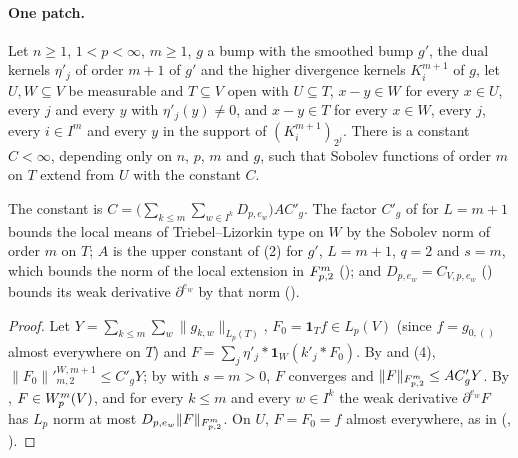 \paragraph{One patch.}

\begin{theorem}
\label{thm:one-patch-extension-higher}
\leanok
{}
Let $n \geq 1$, $1 < p < \infty$, $m \geq 1$, $g$ a bump with the smoothed bump $g'$, the dual
kernels $\eta'_j$ of order $m + 1$ of $g'$ and the higher divergence kernels $K^{m+1}_i$ of $g$,
let $U, W \subseteq V$ be measurable and $T \subseteq V$ open with $U \subseteq T$, $x - y \in W$
for every $x \in U$, every $j$ and every $y$ with $\eta'_j(y) \neq 0$, and $x - y \in T$ for
every $x \in W$, every $j$, every $i \in I^m$ and every $y$ in the support of
$(K^{m+1}_i)_{2^j}$. There is a constant $C < \infty$, depending only on $n$, $p$, $m$ and $g$,
such that Sobolev functions of order $m$ on $T$ extend from $U$ with the constant $C$.
\end{theorem}

The constant is $C = \bigl(\sum_{k \leq m} \sum_{w \in I^k} D_{p, e_w}\bigr) A C'_g$. The factor
$C'_g$ of  for $L = m + 1$ bounds the local means of
Triebel--Lizorkin type on $W$ by the Sobolev norm of order $m$ on $T$; $A$ is the upper constant
of  (2) for $g'$, $L = m + 1$, $q = 2$ and $s = m$, which bounds the
norm of the local extension in $F^{m}_{p,2}$ (); and
$D_{p,e_w} = C_{V,p,e_w}$ () bounds its weak derivative
$\partial^{e_w}$ by that norm ().

\begin{proof}
\leanok
Let $Y = \sum_{k \leq m} \sum_w \|g_{k,w}\|_{L_p(T)}$, $F_0 = \mathbf 1_T f \in L_p(V)$ (since
$f = g_{0,()}$ almost everywhere on $T$) and $F = \sum_j \eta'_j * \mathbf 1_W (k'_j * F_0)$.
By  and  (4),
$\|F_0\|'^{W,m+1}_{m,2} \leq C'_g Y$; by  with $s = m > 0$, $F$
converges and $\|F\|_{F^{m}_{p,2}} \leq A C'_g Y$. By
, $F \in W^{m}_{p}(V)$, and for every $k \leq m$ and every
$w \in I^k$ the weak derivative $\partial^{e_w} F$ has $L_p$ norm at most
$D_{p,e_w} \|F\|_{F^{m}_{p,2}}$. On $U$, $F = F_0 = f$ almost everywhere, as in
 (, ).
\end{proof}

